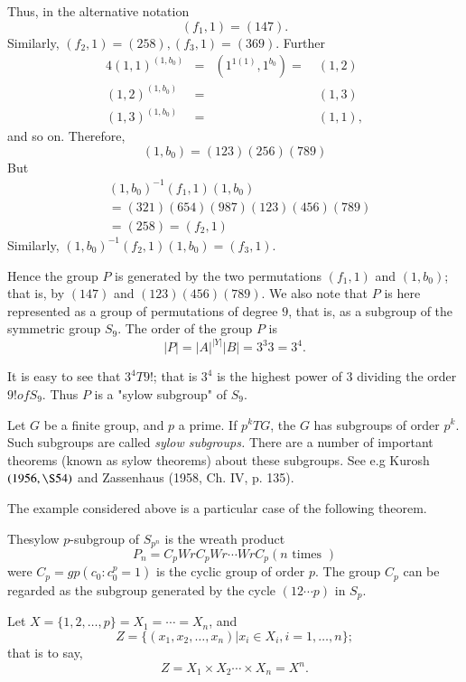 Thus, in the alternative notation
$$
(f_1,  1) = (147).
$$
Similarly, $(f_2, 1) = (258), (f_3, 1) = (369)$. Further
\begin{alignat*}{4}
  (1, 1)^{(1,b_0)} & = &(1^{1(1)}, 1^{b_0}) = ~&(1,2) \\
  (1,2)^{(1,b_0)}  & = && (1,3) \\
  (1,3)^{(1,b_0)}  & = & & (1,1),
\end{alignat*}
and so on.  Therefore, 
$$
(1, b_0) = (123) (256) (789)
$$
But\pageoriginale
\begin{align*}
  & (1, b_0)^{-1} (f_1,  1) (1, b_0)\\
  & = (321) (654) (987) (123) (456) (789) \\
  & = (258) = (f_2,  1)
\end{align*}
Similarly, $(1, b_0)^{-1} (f_2,  1) (1, b_0) = (f_3, 1)$.

Hence the group $P$ is generated by the two permutations $(f_1, 1)$
and $(1, b_0)$; that is, by $(147)$ and $(123) (456) (789)$. We also
note that $P$ is here represented as a group of permutations of degree
$9$, that is, as a subgroup of the symmetric group $S_9$. The order of
the group $P$ is  
$$
|P| = |A|^{|Y|} |B| = 3^3 3 = 3^4.
$$

It is easy to see that $3^4 T 9!$; that is $3^4$ is the highest power
of $3$ dividing the order $9 ! of S_9$. Thus $P$ is a "sylow subgroup"
of $S_9$. 

Let $G$ be a finite group, and $p$ a prime. If $p^k T G$, the $G$ has
subgroups of order $p^k$. Such subgroups are called \textit{sylow
  subgroups.} There are a number of important theorems (known as sylow
theorems) about these subgroups. See e.g Kurosh $(1956,  \S 54)$ and
Zassenhaus (1958, Ch. IV, p. 135). 

The example considered above is a particular case of the following theorem.

\begin{theorem}[Kaloujnine, 1948]\label{chap6:sec7:thm5}%
  The\pageoriginale sylow $p$-subgroup of $S_{p^n}$ is the wreath product
  $$
  P_n = C_p Wr C_p Wr \cdots Wr C_p (n \text{ times })
  $$
  were $C_p = gp (c_0 : c^p_0 = 1)$ is the cyclic group of order
  $p$. The group $C_p$ can be regarded as the subgroup generated by
  the cycle $(12 \cdots p)$ in $S_p$. 
\end{theorem}

Let $X = \{ 1, 2,  \ldots,  p\} = X_1 = \cdots = X_n $, and
$$
Z = \bigg\{(x_1, x_2, \ldots,  x_n) \bigg| x_i \in X_i, i = 1,
\ldots, n  \bigg\}; 
$$
that is to say, 
$$
Z = X_1 \times X_2 \cdots \times X_n = X^n.
$$

